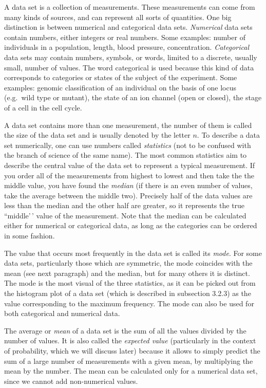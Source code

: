\documentclass[
]{book}
\theoremstyle{definition}
\theoremstyle{definition}
\theoremstyle{definition}
\theoremstyle{remark}
\begin{document}
A data set is a collection of measurements. These measurements can come from many kinds of sources, and can represent all sorts of quantities. One big distinction is between numerical and categorical data sets. \emph{Numerical}  data sets contain numbers, either integers or real numbers. Some examples: number of individuals in a population, length, blood pressure, concentration. \emph{Categorical}  data sets may contain numbers, symbols, or words, limited to a discrete, usually small, number of values. The word categorical is used because this kind of data corresponds to categories or states of the subject of the experiment. Some examples: genomic classification of an individual on the basis of one locus (e.g.~wild type or mutant), the state of an ion channel (open or closed), the stage of a cell in the cell cycle.

A data set contains more than one measurement, the number of them is called the size of the data set and is usually denoted by the letter \(n\). To describe a data set numerically, one can use numbers called \emph{statistics} (not to be confused with the branch of science of the same name). The most common statistics aim to describe the central value of the data set to represent a typical measurement. If you order all of the measurements from highest to lowest and then take the the middle value, you have found the  \emph{median} (if there is an even number of values, take the average between the middle two). Precisely half of the data values are less than the median and the other half are greater, so it represents the true ``middle'\,' value of the measurement. Note that the median can be calculated either for numerical or categorical data, as long as the categories can be ordered in some fashion.

The value that occurs most frequently in the data set is called its \emph{mode}. For some data sets, particularly those which are symmetric, the mode coincides with the mean (see next paragraph) and the median, but for many others it is distinct. The mode is the most visual of the three statistics, as it can be picked out from the histogram plot of a data set (which is described in subsection 3.2.3) as the value corresponding to the maximum frequency. The mode can also be used for both categorical and numerical data.

The average or  \emph{mean} of a data set is the sum of all the values divided by the number of values. It is also called the \emph{expected value} (particularly in the context of probability, which we will discuss later) because it allows to simply predict the sum of a large number of measurements with a given mean, by multiplying the mean by the number. The mean can be calculated only for a numerical data set, since we cannot add non-numerical values.
\end{document}
